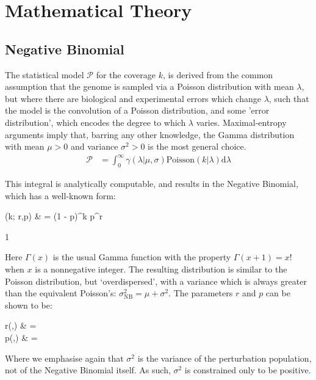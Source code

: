 \documentclass[fleqn,usenatbib]{mnras}
\renewcommand{\d}{\mathrm d}
\def\commentVisible{1}
\newcommand\comment[1]
{
	{
		\if\commentVisible1
			\color{red!70!black}
		\else
			\color{black}
		\fi

		#1
	}
}
\begin{document}
								



			
				
			\appendix
			{\small 
			\section{Mathematical Theory}\label{A:Theory}
				\subsection{Negative Binomial}
					The statistical model $\mathcal{P}$ for the coverage $k$, is derived from the common assumption that the genome is sampled via a Poisson distribution with mean $\lambda$, but where there are biological and experimental errors which change $\lambda$, such that the model is the convolution of a Poisson distribution, and some 'error distribution', which encodes the degree to which $\lambda$ varies. Maximal-entropy arguments imply that, barring any other knowledge, the Gamma distribution with mean $\mu > 0$ and variance $\sigma^2 > 0$ is the most general choice. 
					\begin{align}
						\mathcal{P} & = \int_0^\infty \gamma(\lambda| \mu,\sigma) \text{Poisson}(k|\lambda) \d \lambda
					\end{align}

					This integral is analytically computable, and results in the Negative Binomial, which has a well-known form:
					\begin{spalign}
						(k; r,p) & =  (1 - p)^k p^r
					\end{spalign}
	\comment{
					Here $\Gamma(x)$ is the usual Gamma function with the property $\Gamma(x+1) = x!$ when $x$ is a nonnegative integer. The resulting distribution is similar to the Poisson distribution, but `overdispersed', with a variance which is always greater than the equivalent Poisson's: $\sigma_\text{NB}^2 = \mu + \sigma^2$. The parameters $r$ and $p$ can be shown to be:
					\begin{spalign}
						r(\mu,\sigma) & = \frac{\mu^2}{\sigma^2}
						\\
						p(\mu,\sigma) & = \frac{\mu}{\mu + \sigma^2}
					\end{spalign}
					Where we emphasise again that $\sigma^2$ is the variance of the perturbation population, not of the Negative Binomial itself. As such, $\sigma^2$ is constrained only to be positive.

}}
\end{document}
